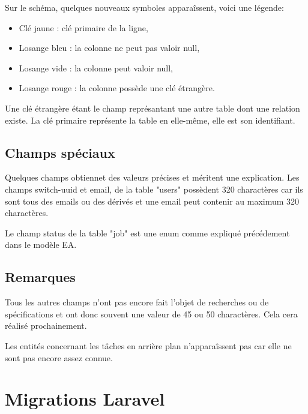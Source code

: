 \documentclass[
    iai, %
    il, %
]{heig-tb}
\begin{document}

Sur le schéma, quelques nouveaux symboles apparaîssent, voici une légende:
\begin{itemize}
    \item Clé jaune : clé primaire de la ligne,
    \item Losange bleu : la colonne ne peut pas valoir null,
    \item Losange vide : la colonne peut valoir null,
    \item Losange rouge : la colonne possède une clé étrangère.
\end{itemize}

Une clé étrangère étant le champ représantant une autre table dont une relation existe. La clé primaire représente la table en elle-même, elle est son identifiant.

\subsection{Champs spéciaux}
Quelques champs obtiennet des valeurs précises et méritent une explication.\newline
Les champs switch-uuid et email, de la table "users" possèdent 320 charactères car ils sont tous des emails ou des dérivés et une email peut contenir au maximum 320 charactères.

Le champ status de la table "job" est une enum comme expliqué précédement dans le modèle EA.

\subsection{Remarques}
Tous les autres champs n'ont pas encore fait l'objet de recherches ou de spécifications et ont donc souvent une valeur de 45 ou 50 charactères. Cela cera réalisé prochainement.

Les entités concernant les tâches en arrière plan n'apparaîssent pas car elle ne sont pas encore assez connue.



\section{Migrations Laravel}
\end{document}

